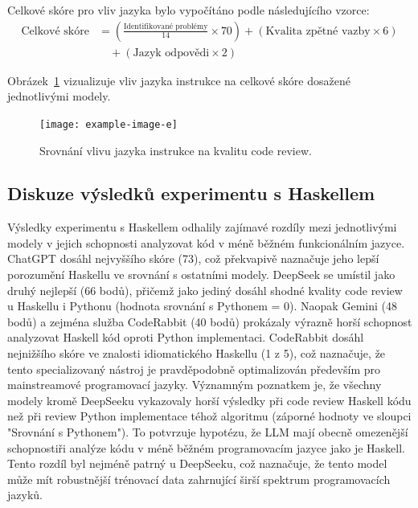 \documentclass[12pt, a4paper]{article}
\begin{document}
\noindent Celkové skóre pro vliv jazyka bylo vypočítáno podle následujícího vzorce:
\begin{align}
\text{Celkové skóre} &= \left(\frac{\text{Identifikované problémy}}{14} \times 70\right) + (\text{Kvalita zpětné vazby} \times 6) \nonumber \\
&\quad + (\text{Jazyk odpovědi} \times 2)
\end{align}

Obrázek~\ref{fig:language_comparison} vizualizuje vliv jazyka instrukce na celkové skóre dosažené jednotlivými modely.

\begin{figure}[H]
\centering
\texttt{[image: example-image-e]}
\caption{Srovnání vlivu jazyka instrukce na kvalitu code review.}
\label{fig:language_comparison}
\end{figure}

\subsection{Diskuze výsledků experimentu s Haskellem}
Výsledky experimentu s Haskellem odhalily zajímavé rozdíly mezi jednotlivými modely v jejich schopnosti analyzovat kód v méně běžném funkcionálním jazyce. ChatGPT dosáhl nejvyššího skóre (73), což překvapivě naznačuje jeho lepší porozumění Haskellu ve srovnání s ostatními modely. DeepSeek se umístil jako druhý nejlepší (66 bodů), přičemž jako jediný dosáhl shodné kvality code review u Haskellu i Pythonu (hodnota srovnání s Pythonem = 0).
Naopak Gemini (48 bodů) a zejména služba CodeRabbit (40 bodů) prokázaly výrazně horší schopnost analyzovat Haskell kód oproti Python implementaci. CodeRabbit dosáhl nejnižšího skóre ve znalosti idiomatického Haskellu (1 z 5), což naznačuje, že tento specializovaný nástroj je pravděpodobně optimalizován především pro mainstreamové programovací jazyky.
Významným poznatkem je, že všechny modely kromě DeepSeeku vykazovaly horší výsledky při code review Haskell kódu než při review Python implementace téhož algoritmu (záporné hodnoty ve sloupci "Srovnání s Pythonem"). To potvrzuje hypotézu, že LLM mají obecně omezenější schopnostiři analýze kódu v méně běžném programovacím jazyce jako je Haskell. Tento rozdíl byl nejméně patrný u DeepSeeku, což naznačuje, že tento model může mít robustnější trénovací data zahrnující širší spektrum programovacích jazyků.
\end{document}
